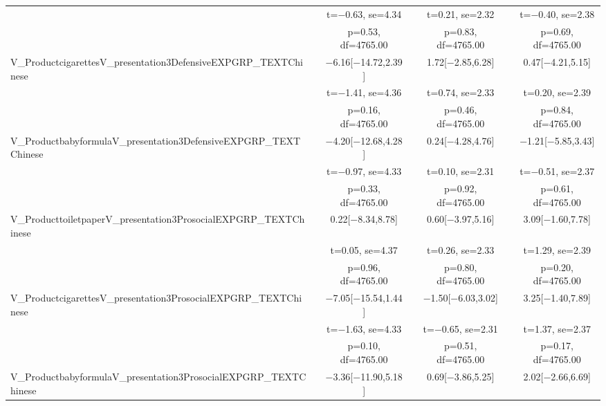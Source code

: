 \documentclass[]{report}
\begin{document}
\begin{table}
{\begin{tabular}[t]{lcccccc}
		&  & t=\num{-0.63}, se=\num{4.34} &  & t=\num{0.21}, se=\num{2.32} &  & t=\num{-0.40}, se=\num{2.38}\\
		&  & p=\num{0.53}, df=\num{4765.00} &  & p=\num{0.83}, df=\num{4765.00} &  & p=\num{0.69}, df=\num{4765.00}\\
		V\_ProductcigarettesV\_presentation3DefensiveEXPGRP\_TEXTChinese &  & \num{-6.16}[\num{-14.72},\num{2.39}] &  & \num{1.72}[\num{-2.85},\num{6.28}] &  & \num{0.47}[\num{-4.21},\num{5.15}]\\
		&  & t=\num{-1.41}, se=\num{4.36} &  & t=\num{0.74}, se=\num{2.33} &  & t=\num{0.20}, se=\num{2.39}\\
		&  & p=\num{0.16}, df=\num{4765.00} &  & p=\num{0.46}, df=\num{4765.00} &  & p=\num{0.84}, df=\num{4765.00}\\
		V\_ProductbabyformulaV\_presentation3DefensiveEXPGRP\_TEXTChinese &  & \num{-4.20}[\num{-12.68},\num{4.28}] &  & \num{0.24}[\num{-4.28},\num{4.76}] &  & \num{-1.21}[\num{-5.85},\num{3.43}]\\
		&  & t=\num{-0.97}, se=\num{4.33} &  & t=\num{0.10}, se=\num{2.31} &  & t=\num{-0.51}, se=\num{2.37}\\
		&  & p=\num{0.33}, df=\num{4765.00} &  & p=\num{0.92}, df=\num{4765.00} &  & p=\num{0.61}, df=\num{4765.00}\\
		V\_ProducttoiletpaperV\_presentation3ProsocialEXPGRP\_TEXTChinese &  & \num{0.22}[\num{-8.34},\num{8.78}] &  & \num{0.60}[\num{-3.97},\num{5.16}] &  & \num{3.09}[\num{-1.60},\num{7.78}]\\
		&  & t=\num{0.05}, se=\num{4.37} &  & t=\num{0.26}, se=\num{2.33} &  & t=\num{1.29}, se=\num{2.39}\\
		&  & p=\num{0.96}, df=\num{4765.00} &  & p=\num{0.80}, df=\num{4765.00} &  & p=\num{0.20}, df=\num{4765.00}\\
		V\_ProductcigarettesV\_presentation3ProsocialEXPGRP\_TEXTChinese &  & \num{-7.05}[\num{-15.54},\num{1.44}] &  & \num{-1.50}[\num{-6.03},\num{3.02}] &  & \num{3.25}[\num{-1.40},\num{7.89}]\\
		&  & t=\num{-1.63}, se=\num{4.33} &  & t=\num{-0.65}, se=\num{2.31} &  & t=\num{1.37}, se=\num{2.37}\\
		&  & p=\num{0.10}, df=\num{4765.00} &  & p=\num{0.51}, df=\num{4765.00} &  & p=\num{0.17}, df=\num{4765.00}\\
		V\_ProductbabyformulaV\_presentation3ProsocialEXPGRP\_TEXTChinese &  & \num{-3.36}[\num{-11.90},\num{5.18}] &  & \num{0.69}[\num{-3.86},\num{5.25}] &  & \num{2.02}[\num{-2.66},\num{6.69}]\\

\end{tabular}}
\end{table}
\end{document}
